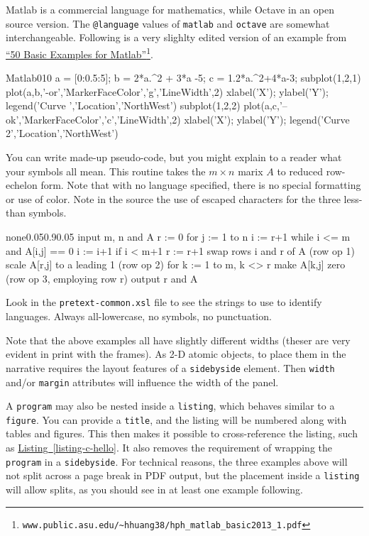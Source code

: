 \documentclass{amsart}
\theoremstyle{plain}%
\theoremstyle{definition}%
\theoremstyle{remark}%
\newcommand{\xreffont}{\relax}
\newcommand{\mono}[1]{\texttt{#1}}
\numberwithin{equation}{section}
\begin{document}
Matlab is a commercial language for mathematics, while Octave in an open source version.  The \mono{@language} values of \mono{matlab} and \mono{octave} are somewhat interchangeable.  Following is a very slighlty edited version of an example from \href{http://www.public.asu.edu/\~hhuang38/hph_matlab_basic2013_1.pdf}{``50 Basic Examples for Matlab''}\footnote{\nolinkurl{www.public.asu.edu/\~hhuang38/hph_matlab_basic2013_1.pdf}\label{section-programs-7-5}}.%
\begin{program}{Matlab}{0}{1}{0}
a = [0:0.5:5]; %
b = 2*a.^2 + 3*a -5;
c = 1.2*a.^2+4*a-3;
subplot(1,2,1)
plot(a,b,'-or','MarkerFaceColor','g','LineWidth',2)
xlabel('X'); ylabel('Y'); legend('Curve ','Location','NorthWest')
subplot(1,2,2)
plot(a,c,'--ok','MarkerFaceColor','c','LineWidth',2)
xlabel('X'); ylabel('Y'); legend('Curve 2','Location','NorthWest')
\end{program}
You can write made-up pseudo-code, but you might explain to a reader what your symbols all mean.  This routine takes the \(m\times n\) marix \(A\) to reduced row-echelon form.  Note that with no language specified, there is no special formatting or use of color.  Note in the source the use of escaped characters for the three less-than symbols.%
\begin{program}{none}{0.05}{0.9}{0.05}
input m, n and A
r := 0
for j := 1 to n
   i := r+1
   while i <= m and A[i,j] == 0
       i := i+1
   if i < m+1
       r := r+1
       swap rows i and r of A (row op 1)
       scale A[r,j] to a leading 1 (row op 2)
       for k := 1 to m, k <> r
           make A[k,j] zero (row op 3, employing row r)
output r and A
\end{program}
Look in the \mono{pretext-common.xsl} file to see the strings to use to identify languages.  Always all-lowercase, no symbols, no punctuation.%
\par
Note that the above examples all have slightly different widths (theser are very evident in print with the frames).  As 2-D atomic objects, to place them in the narrative requires the layout features of a \mono{sidebyside} element.  Then \mono{width} and\slash{}or \mono{margin} attributes will influence the width of the panel.%
\par
A \mono{program} may also be nested inside a \mono{listing}, which behaves similar to a \mono{figure}.  You can provide a \mono{title}, and the listing will be numbered along with tables and figures.  This then makes it possible to cross-reference the listing, such as \hyperref[listing-c-hello]{Listing~{\xreffont\ref{listing-c-hello}}}.  It also removes the requirement of wrapping the \mono{program} in a \mono{sidebyside}.  For technical reasons, the three examples above will not split across a page break in PDF output, but the placement inside a \mono{listing} will allow splits, as you should see in at least one example following.%
\end{document}
